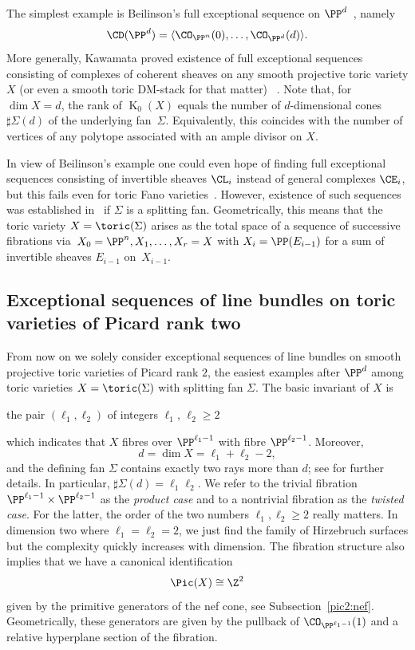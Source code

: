 The simplest example is Beilinson's
full exceptional sequence on $\PP^{d}$~\cite{beilinson},
namely
$$
\CD(\PP^{d})=\langle\CO_{\PP^n}(0),\ldots,
\CO_{\PP^{d}}({d})\rangle.
$$
More generally, Kawamata proved existence of 
full exceptional sequences consisting of complexes 
of coherent sheaves on any smooth 
projective toric variety $X$ (or even a smooth 
toric DM-stack for that matter)
~\cite{kaw1,kaw2,kaw3}. Note that,
{for $\dim X = d$, }the 
rank of $\operatorname{K}_0(X)$ equals the number of 
$d$-dimensional cones $\sharp\Sigma(d)$ of the 
underlying fan~$\Sigma$. 
Equivalently, this coincides with the number of 
vertices of any polytope associated with an 
ample divisor on $X$. 

In view of Beilinson's example one could even 
hope of finding full exceptional sequences 
consisting of invertible sheaves 
$\CL_i$ instead of general complexes $\CE_i$, 
but this fails even for toric Fano 
varieties~\cite{efimov}. However, 
existence of such sequences was established 
in~\cite{CostaMiroRoig} if $\Sigma$ is a 
splitting fan. Geometrically, this means that the 
toric variety $X=\toric(\Sigma)$ arises as the 
total space of a sequence of successive fibrations 
via~$X_0=\PP^n,X_1,\ldots,X_r=X$ with 
$X_i=\PP(E_{i-1})$ for a sum of invertible sheaves 
$E_{i-1}$ on~$X_{i-1}$. 

\subsection{Exceptional sequences of line bundles on 
toric varieties of Picard rank two}
\label{subsec:CoSmToVaPic2}
From now on we solely consider exceptional sequences
of line bundles on smooth projective toric varieties 
of Picard rank $2$, the easiest examples { after 
$\PP^{d}$ among toric varieties $X=\toric(\Sigma)$ 
with splitting fan $\Sigma$.} 
The basic invariant of $X$ is 
\begin{center}
the pair $(\ell_1,\ell_2)$ of integers 
$\ell_1$, $\ell_2\geq2$  
\end{center}
which indicates that $X$ fibres over $\PP^{\ell_1-1}$ 
with fibre $\PP^{\ell_2-1}$. {Moreover,
\[
d=\dim X=\ell_1+\ell_2-2,  
\]
and} the defining fan $\Sigma$ 
contains exactly two rays more than $d$; see 
 for further details. 
In particular, $\sharp\Sigma(d)=\ell_1\ell_2$.
We refer to the trivial fibration 
$\PP^{\ell_1-1}\times\PP^{\ell_2-1}$ as the 
{\em product case} and to a nontrivial fibration as 
the {\em twisted case}. For the latter, the order 
of the two numbers $\ell_1,\ell_2\geq 2$ really 
matters. In dimension two where $\ell_1=\ell_2=2$, 
we just find the family of Hirzebruch surfaces
but the complexity quickly increases with dimension. 
{The fibration structure also implies that 
we have a canonical identification 
$$
\Pic(X)\cong\Z^2 
$$
given by the primitive generators of the nef cone, 
see Subsection~\ref{pic2:nef}. Geometrically, 
these generators are given by the pullback of 
$\CO_{\PP^{\ell_1-1}}(1)$ and a relative hyperplane 
section of the fibration.}

